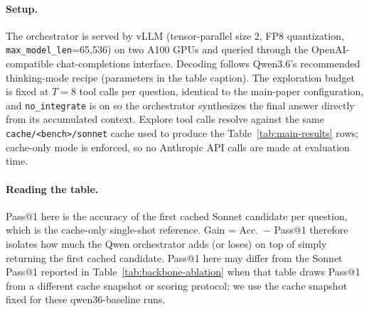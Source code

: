 \paragraph{Setup.} The orchestrator is served by vLLM (tensor-parallel size 2, FP8 quantization, \texttt{max\_model\_len}{=}65{,}536) on two A100 GPUs and queried through the OpenAI-compatible chat-completions interface. Decoding follows Qwen3.6's recommended thinking-mode recipe (parameters in the table caption). The exploration budget is fixed at $T{=}8$ tool calls per question, identical to the main-paper \our{} configuration, and \texttt{no\_integrate} is on so the orchestrator synthesizes the final answer directly from its accumulated context. Explore tool calls resolve against the same \texttt{cache/<bench>/sonnet} cache used to produce the Table~\ref{tab:main-results} \our{} rows; cache-only mode is enforced, so no Anthropic API calls are made at evaluation time.

\paragraph{Reading the table.} Pass@1 here is the accuracy of the first cached Sonnet candidate per question, which is the cache-only single-shot reference. Gain = Acc.\ $-$ Pass@1 therefore isolates how much the Qwen orchestrator adds (or loses) on top of simply returning the first cached candidate. Pass@1 here may differ from the Sonnet Pass@1 reported in Table~\ref{tab:backbone-ablation} when that table draws Pass@1 from a different cache snapshot or scoring protocol; we use the cache snapshot fixed for these qwen36-baseline runs.

